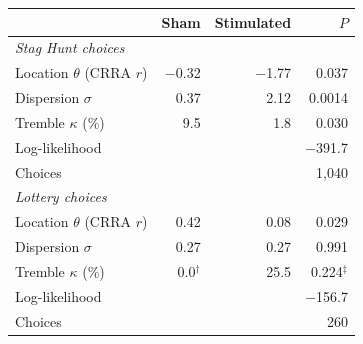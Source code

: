\small
\begin{tabular}{lrrr}
\toprule
& Sham & Stimulated & $P$ \\
\midrule
\textit{Stag Hunt choices} &  &  &  \\
\quad Location $\theta$ (CRRA $r$) & $-$0.32 & $-$1.77 & 0.037 \\
\quad Dispersion $\sigma$ & 0.37 & 2.12 & 0.0014 \\
\quad Tremble $\kappa$ (\%) & 9.5 & 1.8 & 0.030 \\
\quad Log-likelihood &  &  & $-$391.7 \\
\quad Choices &  &  & 1,040 \\
\textit{Lottery choices} &  &  &  \\
\quad Location $\theta$ (CRRA $r$) & 0.42 & 0.08 & 0.029 \\
\quad Dispersion $\sigma$ & 0.27 & 0.27 & 0.991 \\
\quad Tremble $\kappa$ (\%) & 0.0$^\dagger$ & 25.5 & 0.224$^\ddagger$ \\
\quad Log-likelihood &  &  & $-$156.7 \\
\quad Choices &  &  & 260 \\
\bottomrule
\end{tabular}
